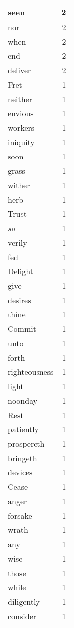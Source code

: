 \begin{center}
\begin{longtable}{l|r}
seen & 2 \\ \hline
nor & 2 \\ \hline
when & 2 \\ \hline
end & 2 \\ \hline
deliver & 2 \\ \hline
Fret & 1 \\ \hline
neither & 1 \\ \hline
envious & 1 \\ \hline
workers & 1 \\ \hline
iniquity & 1 \\ \hline
soon & 1 \\ \hline
grass & 1 \\ \hline
wither & 1 \\ \hline
herb & 1 \\ \hline
Trust & 1 \\ \hline
\emph{so} & 1 \\ \hline
verily & 1 \\ \hline
fed & 1 \\ \hline
Delight & 1 \\ \hline
give & 1 \\ \hline
desires & 1 \\ \hline
thine & 1 \\ \hline
Commit & 1 \\ \hline
unto & 1 \\ \hline
forth & 1 \\ \hline
righteousness & 1 \\ \hline
light & 1 \\ \hline
noonday & 1 \\ \hline
Rest & 1 \\ \hline
patiently & 1 \\ \hline
prospereth & 1 \\ \hline
bringeth & 1 \\ \hline
devices & 1 \\ \hline
Cease & 1 \\ \hline
anger & 1 \\ \hline
forsake & 1 \\ \hline
wrath & 1 \\ \hline
any & 1 \\ \hline
wise & 1 \\ \hline
those & 1 \\ \hline
while & 1 \\ \hline
diligently & 1 \\ \hline
consider & 1 \\ \hline

\end{longtable}
\end{center}
